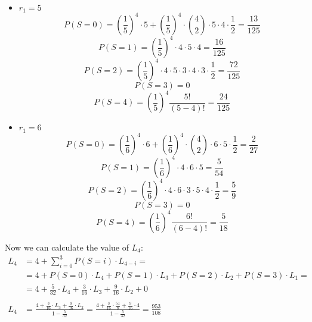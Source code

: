 \begin{itemize}
\item $r_1 = 5$
\begin{equation}
P(S=0) = (\frac{1}{5})^4 \cdot 5 +  (\frac{1}{5})^4 \cdot \binom{4}{2} \cdot 5 \cdot 4 \cdot \frac{1}{2} = \frac{13}{125}
\end{equation}
\begin{equation}
P(S=1) = (\frac{1}{5})^4 \cdot 4 \cdot 5 \cdot 4 = \frac{16}{125}
\end{equation}
\begin{equation}
P(S=2) = (\frac{1}{5})^4 \cdot 4 \cdot 5 \cdot 3 \cdot 4 \cdot 3 \cdot \frac{1}{2} = \frac{72}{125}
\end{equation}
\begin{equation}
P(S=3) = 0
\end{equation}
\begin{equation}
P(S=4) = (\frac{1}{5})^4 \frac{5!}{(5-4)!} = \frac{24}{125}
\end{equation}

\item $r_1 = 6$
\begin{equation}
P(S=0) = (\frac{1}{6})^4 \cdot 6 +  (\frac{1}{6})^4 \cdot \binom{4}{2} \cdot 6 \cdot 5 \cdot \frac{1}{2} = \frac{2}{27}
\end{equation}
\begin{equation}
P(S=1) = (\frac{1}{6})^4 \cdot 4 \cdot 6 \cdot 5 = \frac{5}{54}
\end{equation}
\begin{equation}
P(S=2) = (\frac{1}{6})^4 \cdot 4 \cdot 6 \cdot 3 \cdot 5 \cdot 4 \cdot \frac{1}{2} = \frac{5}{9}
\end{equation}
\begin{equation}
P(S=3) = 0
\end{equation}
\begin{equation}
P(S=4) = (\frac{1}{6})^4 \frac{6!}{(6-4)!} = \frac{5}{18}
\end{equation}
\end{itemize}

Now we can calculate the value of $L_4$:
\begin{equation}
\begin{split}
L_4 & = 4 + \sum_{i=0}^{3} P(S=i) \cdot L_{4-i} = \\
& = 4 + P(S=0) \cdot L_4 + P(S=1) \cdot L_3 +  P(S=2) \cdot L_2 +  P(S=3) \cdot L_1 = \\
& = 4 + \frac{5}{32} \cdot L_4 + \frac{3}{16} \cdot L_3 + \frac{9}{16} \cdot L_2 + 0 \\ \\
L_4 & = \frac{4 + \frac{3}{16} \cdot L_3 + \frac{9}{16} \cdot L_2}{1 - \frac{5}{32}} = \frac{4 + \frac{3}{16} \cdot \frac{51}{8} + \frac{9}{16} \cdot 4}{1 - \frac{5}{32}} = \frac{953}{108}
\end{split}
\end{equation}

